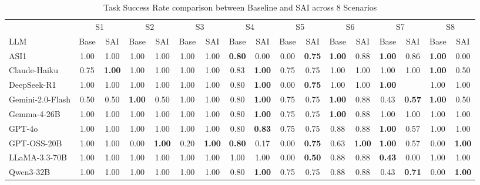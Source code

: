 \begin{table}[t]
\centering
\setlength{\tabcolsep}{4pt}
\caption{Task Success Rate comparison between Baseline and SAI across 8 Scenarios}
\label{tab:task_success_rate}
\begin{tabular}{lcccccccccccccccc}
\toprule
& \multicolumn{2}{c}{S1} & \multicolumn{2}{c}{S2} & \multicolumn{2}{c}{S3} & \multicolumn{2}{c}{S4} & \multicolumn{2}{c}{S5} & \multicolumn{2}{c}{S6} & \multicolumn{2}{c}{S7} & \multicolumn{2}{c}{S8} \\
\cmidrule(lr){2-3} \cmidrule(lr){4-5} \cmidrule(lr){6-7} \cmidrule(lr){8-9} \cmidrule(lr){10-11} \cmidrule(lr){12-13} \cmidrule(lr){14-15} \cmidrule(lr){16-17}
LLM & Base & SAI & Base & SAI & Base & SAI & Base & SAI & Base & SAI & Base & SAI & Base & SAI & Base & SAI \\
\midrule
ASI1 & 1.00 & 1.00 & 1.00 & 1.00 & 1.00 & 1.00 & \textbf{0.80} & \cellcolor{red!15}0.00 & 0.00 & \cellcolor{green!20}\textbf{0.75} & \textbf{1.00} & \cellcolor{red!15}0.88 & \textbf{1.00} & \cellcolor{red!15}0.86 & \textbf{1.00} & \cellcolor{red!15}0.00 \\
Claude-Haiku & 0.75 & \cellcolor{green!20}\textbf{1.00} & 1.00 & 1.00 & 1.00 & 1.00 & 0.83 & \cellcolor{green!20}\textbf{1.00} & 0.75 & 0.75 & 1.00 & 1.00 & 1.00 & 1.00 & \textbf{1.00} & \cellcolor{red!15}0.50 \\
DeepSeek-R1 & 1.00 & 1.00 & 1.00 & 1.00 & 1.00 & 1.00 & 0.80 & \cellcolor{green!20}\textbf{1.00} & 0.00 & \cellcolor{green!20}\textbf{0.75} & 1.00 & 1.00 & \textbf{1.00} & \text{--} & 1.00 & 1.00 \\
Gemini-2.0-Flash & 0.50 & 0.50 & \textbf{1.00} & \cellcolor{red!15}0.50 & 1.00 & 1.00 & 0.80 & \cellcolor{green!20}\textbf{1.00} & 0.75 & 0.75 & \textbf{1.00} & \cellcolor{red!15}0.88 & 0.43 & \cellcolor{green!20}\textbf{0.57} & \textbf{1.00} & \cellcolor{red!15}0.50 \\
Gemma-4-26B & 1.00 & 1.00 & 1.00 & 1.00 & 1.00 & 1.00 & 0.80 & \cellcolor{green!20}\textbf{1.00} & 0.75 & 0.75 & \textbf{1.00} & \cellcolor{red!15}0.88 & 1.00 & 1.00 & 1.00 & 1.00 \\
GPT-4o & 1.00 & 1.00 & 1.00 & 1.00 & 1.00 & 1.00 & 0.80 & \cellcolor{green!20}\textbf{0.83} & 0.75 & 0.75 & 0.88 & 0.88 & \textbf{1.00} & \cellcolor{red!15}0.57 & 1.00 & 1.00 \\
GPT-OSS-20B & 1.00 & 1.00 & 0.00 & \cellcolor{green!20}\textbf{1.00} & 0.20 & \cellcolor{green!20}\textbf{1.00} & \textbf{0.80} & \cellcolor{red!15}0.17 & 0.00 & \cellcolor{green!20}\textbf{0.75} & 0.63 & \cellcolor{green!20}\textbf{1.00} & \textbf{1.00} & \cellcolor{red!15}0.57 & 0.00 & \cellcolor{green!20}\textbf{1.00} \\
LLaMA-3.3-70B & 1.00 & 1.00 & 1.00 & 1.00 & 1.00 & 1.00 & 1.00 & 1.00 & 0.00 & \cellcolor{green!20}\textbf{0.50} & 0.88 & 0.88 & \textbf{0.43} & \cellcolor{red!15}0.00 & 1.00 & 1.00 \\
Qwen3-32B & 1.00 & 1.00 & 1.00 & 1.00 & 1.00 & 1.00 & 0.80 & \cellcolor{green!20}\textbf{1.00} & 0.75 & 0.75 & 0.88 & 0.88 & 0.43 & \cellcolor{green!20}\textbf{0.71} & 0.00 & \cellcolor{green!20}\textbf{1.00} \\
\bottomrule
\end{tabular}
\end{table}
